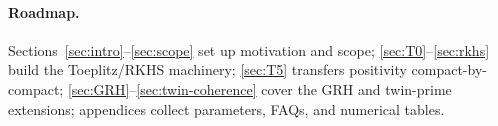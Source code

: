 \paragraph{Roadmap.} Sections~\ref{sec:intro}--\ref{sec:scope} set up motivation and scope; \ref{sec:T0}--\ref{sec:rkhs} build the Toeplitz/RKHS machinery; \ref{sec:T5} transfers positivity compact-by-compact; \ref{sec:GRH}--\ref{sec:twin-coherence} cover the GRH and twin-prime extensions; appendices collect parameters, FAQs, and numerical tables.

















